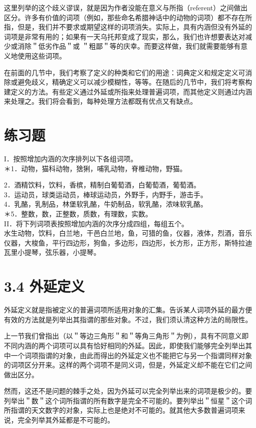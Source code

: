这里列举的这个歧义谬误，就是因为作者没能在意义与所指（referent）之间做出区分。许多有价值的词项（例如，那些命名希腊神话中的动物的词项）都不存在所指，但是，我们并不要求或期望这样的词项消失。实际上，具有内涵但没有外延的词项是非常有用的；如果有一天乌托邦变成了现实，那么，我们也许想要表达对减少或消除＂低劣作品＂或 ＂粗鄙＂等的庆幸。而要这样做，我们就需要能够有意义地使用这些词项。

在前面的几节中，我们考察了定义的种类和它们的用途：词典定义和规定定义可消除或避免歧义，精确定义可以减少模糊性，等等。在随后的几节中，我们将考察构建定义的方法。有些定义通过外延或所指来处理普遍词项，而其他定义则通过内涵来处理之。我们将会看到，每种处理方法都既有优点又有缺点。

\section*{练习题}
I．按照增加内涵的次序排列以下各组词项。\\
＊1．动物，猫科动物，猞猁，哺乳动物，脊椎动物，野猫。

2．酒精饮料，饮料，香槟，精制白葡萄酒，白葡萄酒，葡萄酒。\\
3．运动员，球类运动员，棒球运动员，外野手，内野手，游击手。\\
4．乳酪，乳制品，林堡软乳酪，牛奶制品，软乳酪，浓味软乳酪。\\
＊5．整数，数，正整数，质数，有理数，实数。\\
II．将下列词项表按照增加内涵的次序分成四组，每组五个。\\
水生动物，饮料，白兰地，干邑白兰地，鱼，可猎的鱼，仪器，液体，烈酒，音乐仪器，大梭鱼，平行四边形，狗鱼，多边形，四边形，长方形，正方形，斯特拉迪瓦里小提琴，弦乐器，小提琴。

\section*{3.4 外延定义}
外延定义就是指被定义的普遍词项所适用对象的汇集。告诉某人词项外延的最方便有效的方法就是列举出其指谓的那些对象。不过，我们须认清这种方法的局限性。

上一节我们曾指出（以＂等边三角形＂和＂等角三角形＂为例），具有不同意义即不同内涵的两个词项可以具有恰好相同的外延。因此，即使我们能够完全列举出其中一个词项指谓的对象，由此而得出的外延定义也不能把它与另一个指谓同样对象的词项区分开来。这样的两个词项不是同义词，但是，外延定义却不能在它们之间做出区分。

然而，这还不是问题的棘手之处，因为外延可以完全列举出来的词项是极少的。要列举出＂数＂这个词所指谓的所有数字是完全不可能的。要列举出＂恒星＂这个词所指谓的天文数字的对象，实际上也是绝对不可能的。就其他大多数普遍词项来说，完全列举其外延都是不可能的。

